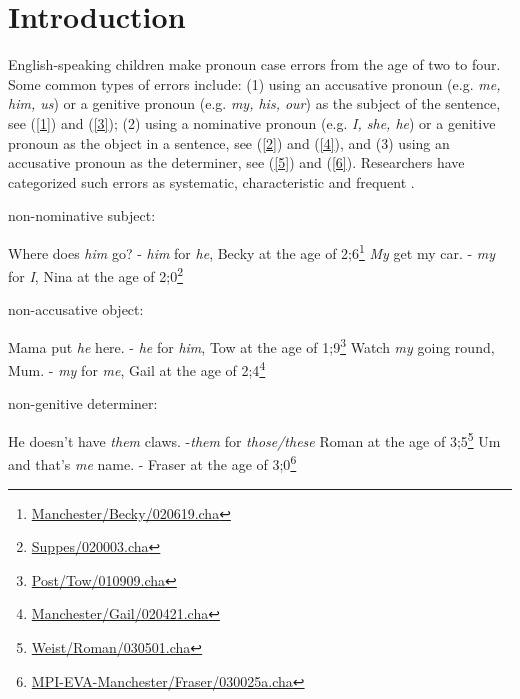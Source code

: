 \section{Introduction}
English-speaking children make pronoun case errors from the age of two to four. Some common types of errors include: (1) using an accusative pronoun (e.g. \textit{me, him, us}) or a genitive pronoun (e.g. \textit{my, his, our}) as the subject of the sentence, see (\ref{1}) and (\ref{3}); (2) using a nominative pronoun (e.g. \textit{I, she, he}) or a genitive pronoun as the object in a sentence, see (\ref{2}) and (\ref{4}), and (3) using an accusative pronoun as the determiner, see (\ref{5}) and (\ref{6}). Researchers have categorized such errors as systematic, characteristic and frequent \citep[e.g.][]{huxley1970development, budwig1989linguistic, pelham2011input,fitzgerald2017case}.

\begin{exe}
\ex \label{01} non-nominative subject:
\begin{xlist}
\ex \label{1} {Where does \textit{him} go? - \textit{him} for \textit{he}, Becky at the age of 2;6\footnote{\href{https://childes.talkbank.org/browser/index.php?url=Eng-UK/Manchester/Becky/020619.cha}{Manchester/Becky/020619.cha}
}}
\ex \label{3} {\textit{My} get my car. - \textit{my} for \textit{I}, Nina at the age of 2;0\footnote{\href{https://childes.talkbank.org/browser/index.php?url=Eng-NA/Suppes/020003.cha}{Suppes/020003.cha}}}
\end{xlist}
\ex non-accusative object:
\begin{xlist}
\ex \label{2} {Mama put \textit{he} here. - \textit{he} for \textit{him}, Tow at the age of 1;9\footnote{\href{https://childes.talkbank.org/browser/index.php?url=Eng-NA/Post/Tow/010909.cha}{Post/Tow/010909.cha}}}
\ex \label{4} {Watch \textit{my} going round, Mum. - \textit{my} for \textit{me}, Gail at the age of 2;4\footnote{\href{https://childes.talkbank.org/browser/index.php?url=Eng-UK/Manchester/Gail/020421.cha}{Manchester/Gail/020421.cha}}}
\end{xlist}
\ex non-genitive determiner:
\begin{xlist}
\ex \label{5} He doesn't have \textit{them} claws. -\textit{them} for \textit{those/these} Roman at the age of 3;5\footnote{\href{https://childes.talkbank.org/browser/index.php?url=Eng-NA/Weist/Roman/030501.cha}{Weist/Roman/030501.cha}}
\ex \label{6} Um and that's \textit{me} name. - Fraser at the age of 3;0\footnote{\href{https://childes.talkbank.org/browser/index.php?url=Eng-UK/MPI-EVA-Manchester/Fraser/030025a.cha}{MPI-EVA-Manchester/Fraser/030025a.cha}}
\end{xlist}
\end{exe}

